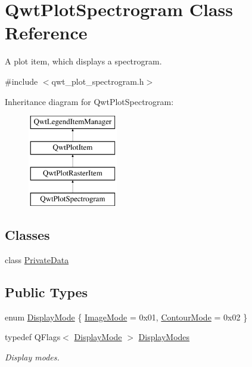 \hypertarget{class_qwt_plot_spectrogram}{\section{Qwt\-Plot\-Spectrogram Class Reference}
\label{class_qwt_plot_spectrogram}
}


A plot item, which displays a spectrogram.  




{\ttfamily \#include $<$qwt\-\_\-plot\-\_\-spectrogram.\-h$>$}

Inheritance diagram for Qwt\-Plot\-Spectrogram\-:\begin{figure}[H]
\begin{center}
\leavevmode
\includegraphics[height=4.000000cm]{class_qwt_plot_spectrogram}
\end{center}
\end{figure}
\subsection*{Classes}
\begin{DoxyCompactItemize}
\item 
class \hyperlink{class_qwt_plot_spectrogram_1_1_private_data}{Private\-Data}
\end{DoxyCompactItemize}
\subsection*{Public Types}
\begin{DoxyCompactItemize}
\item 
enum \hyperlink{class_qwt_plot_spectrogram_a7f4904fe68b442d0f93040ea1fa1d062}{Display\-Mode} \{ \hyperlink{class_qwt_plot_spectrogram_a7f4904fe68b442d0f93040ea1fa1d062ac9696cad413e4a11a4721779728fb9e3}{Image\-Mode} = 0x01, 
\hyperlink{class_qwt_plot_spectrogram_a7f4904fe68b442d0f93040ea1fa1d062a64e86465a6d48ad80c4baadb144f9cf8}{Contour\-Mode} = 0x02
 \}
\item 
typedef Q\-Flags$<$ \hyperlink{class_qwt_plot_spectrogram_a7f4904fe68b442d0f93040ea1fa1d062}{Display\-Mode} $>$ \hyperlink{class_qwt_plot_spectrogram_a245a6d1281abe84d177d61be0698db55}{Display\-Modes}
\begin{DoxyCompactList}\small\item\em Display modes. \end{DoxyCompactList}\end{DoxyCompactItemize}
